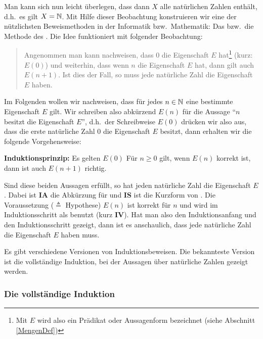 \medskip

Man kann sich nun leicht überlegen, dass dann $X$ alle natürlichen Zahlen enthält, d.h.~es 
gilt $X = \mathbb N$. Mit Hilfe dieser Beobachtung konstruieren wir eine der nützlichsten 
Beweismethoden in der Informatik bzw.~Mathematik: Das  
bzw.~die Methode des . Die Idee funktioniert mit folgender
Beobachtung:


\begin{quote}
Angenommen man kann nachweisen, dass $0$ die Eigenschaft 
$E$ hat\footnote{Mit $E$ wird also ein Prädikat oder Aussagenform bezeichnet (siehe Abschnitt 
\ref{MengenDef})} (kurz: $E(0)$) und weiterhin, dass wenn $n$ die Eigenschaft $E$ hat, dann gilt auch 
$E(n+1)$. Ist dies der Fall, so muss jede natürliche Zahl die Eigenschaft $E$ haben. 
\end{quote}

Im Folgenden wollen wir nachweisen, dass für jedes $n \in \mathbb N$ eine bestimmte Eigenschaft $E$ gilt. Wir
schreiben also abkürzend $E(n)$ für die Aussage "`$n$ besitzt die Eigenschaft
$E$"', d.h.~der Schreibweise $E(0)$ drücken wir also
aus, dass die erste natürliche Zahl $0$ die Eigenschaft $E$ besitzt, dann 
erhalten wir die folgende Vorgehensweise:

\medskip

\noindent\textbf{Induktionsprinzip:} Es gelten
\indudef%
{$E(0)$}%
{Für $n \ge 0$ gilt, wenn $E(n)$ korrekt ist,
dann ist auch $E(n+1)$ richtig.}
\medskip

Sind diese beiden Aussagen erfüllt, so hat jeden natürliche Zahl die Eigenschaft $E$. 
Dabei ist \textbf{\textsf{IA}} die Abkürzung für
 und \textbf{\textsf{IS}} ist die Kurzform von
. Die Voraussetzung ($\triangleq$ Hypothese)
$E(n)$ ist korrekt für $n$ und wird im Induktionsschritt
als  benutzt
(kurz \textbf{\textsf{IV}}). Hat man also den Induktionsanfang und den
Induktionsschritt gezeigt, dann ist es anschaulich, dass jede natürliche Zahl die
Eigenschaft $E$ haben muss.

Es gibt verschiedene Versionen von Induktionsbeweisen. Die bekannteste
Version ist die vollständige Induktion, bei der Aussagen über
natürliche Zahlen gezeigt werden.

\subsubsection{Die vollständige Induktion}

